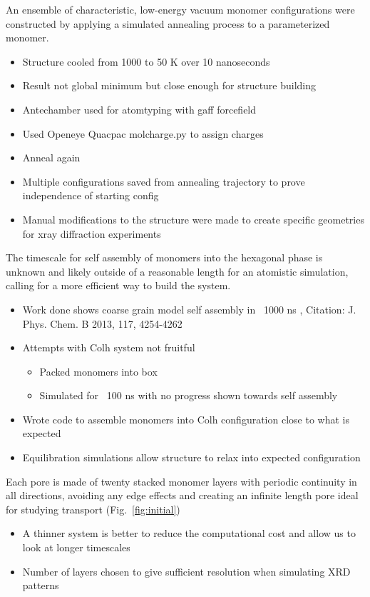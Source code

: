 \documentclass{article}
\begin{document}
	An ensemble of characteristic, low-energy vacuum monomer configurations were constructed by applying a simulated annealing process to a parameterized monomer.
	\begin{itemize}
		\item Structure cooled from 1000 to 50 K over 10 nanoseconds
		\item Result not global minimum but close enough for structure building
		\item Antechamber used for atomtyping with gaff forcefield
		\item Used Openeye Quacpac molcharge.py to assign charges %
		\item Anneal again 
		\item Multiple configurations saved from annealing trajectory to prove independence of starting config
		\item Manual modifications to the structure were made to create specific geometries for xray diffraction experiments
	\end{itemize}
	
	The timescale for self assembly of monomers into the hexagonal phase is unknown and likely outside of a reasonable length for an atomistic simulation, calling for a more efficient way to build the system. 
	\begin{itemize}
		\item Work done shows coarse grain model self assembly in ~1000 ns , Citation: J. Phys. Chem. B 2013, 117, 4254-4262
		\item Attempts with Colh system not fruitful  
		\begin{itemize}
			\item Packed monomers into box
			\item Simulated for ~100 ns with no progress shown towards self assembly
		\end{itemize}  
		\item Wrote code to assemble monomers into Colh configuration close to what is expected 
		\item Equilibration simulations allow structure to relax into expected configuration 
	\end{itemize}
	Each pore is made of twenty stacked monomer layers with periodic continuity in all directions, avoiding any edge effects and creating an infinite length pore ideal for studying transport (Fig.~\ref{fig:initial})
	\begin{itemize}
		\item A thinner system is better to reduce the computational cost and allow us to look at longer timescales
		\item Number of layers chosen to give sufficient resolution when simulating XRD patterns
	\end{itemize}
\end{document}
